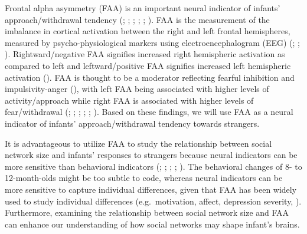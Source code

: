\documentclass[
  man,
  floatsintext,
  longtable,
  nolmodern,
  notxfonts,
  notimes,
  colorlinks=true,linkcolor=blue,citecolor=blue,urlcolor=blue]{apa7}
\begin{document}
Frontal alpha asymmetry (FAA) is an important neural indicator of
infants' approach/withdrawal tendency
(;
;
;
;
;
). FAA is the measurement of the imbalance in cortical
activation between the right and left frontal hemispheres, measured by
psycho-physiological markers using electroencephalogram (EEG)
(;
;
).
Rightward/negative FAA signifies increased right hemispheric activation
as compared to left and leftward/positive FAA signifies increased left
hemispheric activation (). FAA is thought to be a moderator reflecting fearful
inhibition and impulsivity-anger
(), with left
FAA being associated with higher levels of activity/approach while right
FAA is associated with higher levels of fear/withdrawal
(;
;
;
;
;
). Based on these findings, we will use FAA as a neural
indicator of infants' approach/withdrawal tendency towards strangers.

It is advantageous to utilize FAA to study the relationship between
social network size and infants' responses to strangers because neural
indicators can be more sensitive than behavioral indicators
(;
;
;
;
). The behavioral changes of 8- to 12-month-olds might be
too subtle to code, whereas neural indicators can be more sensitive to
capture individual differences, given that FAA has been widely used to
study individual differences (e.g.~motivation, affect, depression
severity, ). Furthermore, examining the relationship between social network
size and FAA can enhance our understanding of how social networks may
shape infant's brains.
\end{document}
